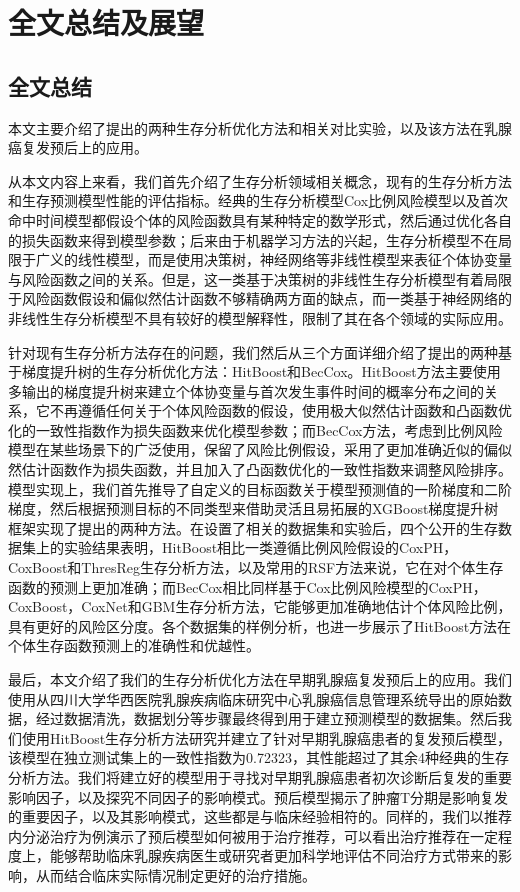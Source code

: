 \chapter{全文总结及展望}

\section{全文总结}
本文主要介绍了提出的两种生存分析优化方法和相关对比实验，以及该方法在乳腺癌复发预后上的应用。

从本文内容上来看，我们首先介绍了生存分析领域相关概念，现有的生存分析方法和生存预测模型性能的评估指标。经典的生存分析模型Cox比例风险模型以及首次命中时间模型都假设个体的风险函数具有某种特定的数学形式，然后通过优化各自的损失函数来得到模型参数；后来由于机器学习方法的兴起，生存分析模型不在局限于广义的线性模型，而是使用决策树，神经网络等非线性模型来表征个体协变量与风险函数之间的关系。但是，这一类基于决策树的非线性生存分析模型有着局限于风险函数假设和偏似然估计函数不够精确两方面的缺点，而一类基于神经网络的非线性生存分析模型不具有较好的模型解释性，限制了其在各个领域的实际应用。

针对现有生存分析方法存在的问题，我们然后从三个方面详细介绍了提出的两种基于梯度提升树的生存分析优化方法：HitBoost和BecCox。HitBoost方法主要使用多输出的梯度提升树来建立个体协变量与首次发生事件时间的概率分布之间的关系，它不再遵循任何关于个体风险函数的假设，使用极大似然估计函数和凸函数优化的一致性指数作为损失函数来优化模型参数；而BecCox方法，考虑到比例风险模型在某些场景下的广泛使用，保留了风险比例假设，采用了更加准确近似的偏似然估计函数作为损失函数，并且加入了凸函数优化的一致性指数来调整风险排序。模型实现上，我们首先推导了自定义的目标函数关于模型预测值的一阶梯度和二阶梯度，然后根据预测目标的不同类型来借助灵活且易拓展的XGBoost梯度提升树框架实现了提出的两种方法。在设置了相关的数据集和实验后，四个公开的生存数据集上的实验结果表明，HitBoost相比一类遵循比例风险假设的CoxPH，CoxBoost和ThresReg生存分析方法，以及常用的RSF方法来说，它在对个体生存函数的预测上更加准确；而BecCox相比同样基于Cox比例风险模型的CoxPH，CoxBoost，CoxNet和GBM生存分析方法，它能够更加准确地估计个体风险比例，具有更好的风险区分度。各个数据集的样例分析，也进一步展示了HitBoost方法在个体生存函数预测上的准确性和优越性。

最后，本文介绍了我们的生存分析优化方法在早期乳腺癌复发预后上的应用。我们使用从四川大学华西医院乳腺疾病临床研究中心乳腺癌信息管理系统导出的原始数据，经过数据清洗，数据划分等步骤最终得到用于建立预测模型的数据集。然后我们使用HitBoost生存分析方法研究并建立了针对早期乳腺癌患者的复发预后模型，该模型在独立测试集上的一致性指数为0.72323，其性能超过了其余4种经典的生存分析方法。我们将建立好的模型用于寻找对早期乳腺癌患者初次诊断后复发的重要影响因子，以及探究不同因子的影响模式。预后模型揭示了肿瘤T分期是影响复发的重要因子，以及其影响模式，这些都是与临床经验相符的。同样的，我们以推荐内分泌治疗为例演示了预后模型如何被用于治疗推荐，可以看出治疗推荐在一定程度上，能够帮助临床乳腺疾病医生或研究者更加科学地评估不同治疗方式带来的影响，从而结合临床实际情况制定更好的治疗措施。

